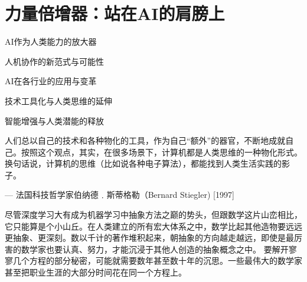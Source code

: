 \chapter{力量倍增器：站在AI的肩膀上}
 \begin{introduction}
  \item AI作为人类能力的放大器
  \item 人机协作的新范式与可能性
  \item AI在各行业的应用与变革
  \item 技术工具化与人类思维的延伸
  \item 智能增强与人类潜能的释放
\end{introduction}


人们总以自己的技术和各种物化的工具，作为自己“额外”的器官，不断地成就自己。按照这个观点，其实，在很多场景下，计算机都是人类思维的一种物化形式。换句话说，计算机的思维（比如说各种电子算法），都能找到人类生活实践的影子。

\begin{flushright}
— 法国科技哲学家伯纳德﹒斯蒂格勒（Bernard Stiegler)  [1997]
\end{flushright}




尽管深度学习大有成为机器学习中抽象方法之巅的势头，但跟数学这片山峦相比，它只能算是个小山丘。在人类建立的所有宏大体系之中，数学比起其他造物要远远更抽象、更深刻。数以千计的著作堆积起来，朝抽象的方向越走越远，即使是最厉害的数学家也要认真、努力，才能沉浸于其他人创造的抽象概念之中。
要解开寥寥几个方程的部分秘密，可能就需要数年甚至数十年的沉思。一些最伟大的数学家甚至把职业生涯的大部分时间花在同一个方程上。


